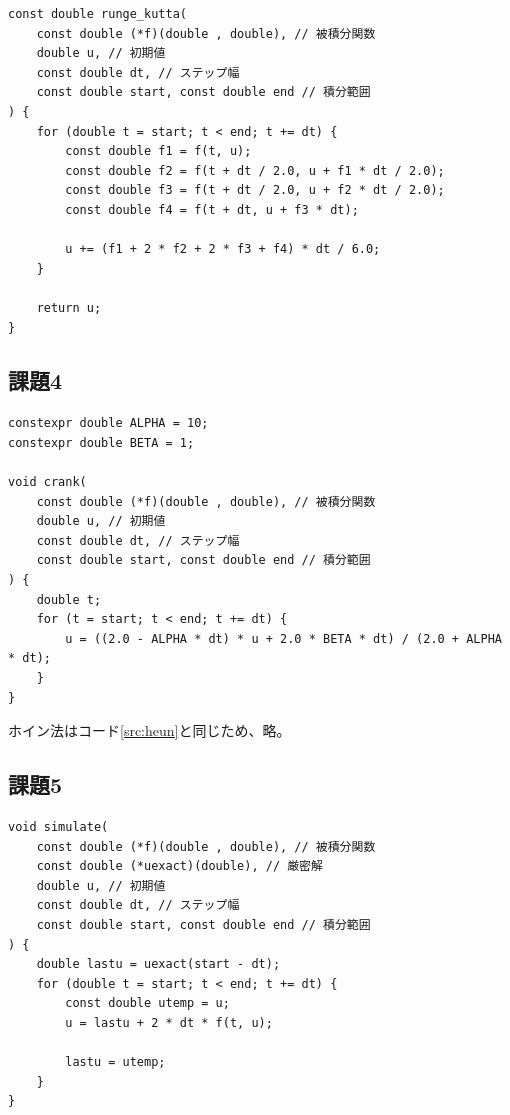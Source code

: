\documentclass[a4j, titlepage]{jsarticle}
\numberwithin{equation}{section}
\begin{document}
        \begin{lstlisting}[caption=4次ルンゲ・クッタ法]
const double runge_kutta(
    const double (*f)(double , double), // 被積分関数
    double u, // 初期値
    const double dt, // ステップ幅
    const double start, const double end // 積分範囲
) {
    for (double t = start; t < end; t += dt) {
        const double f1 = f(t, u);
        const double f2 = f(t + dt / 2.0, u + f1 * dt / 2.0);
        const double f3 = f(t + dt / 2.0, u + f2 * dt / 2.0);
        const double f4 = f(t + dt, u + f3 * dt);

        u += (f1 + 2 * f2 + 2 * f3 + f4) * dt / 6.0;
    }

    return u;
}
        \end{lstlisting}

    \subsection{課題4}
        \begin{lstlisting}[caption=クランク・ニコルソン法]
constexpr double ALPHA = 10;
constexpr double BETA = 1;

void crank(
    const double (*f)(double , double), // 被積分関数
    double u, // 初期値
    const double dt, // ステップ幅
    const double start, const double end // 積分範囲
) {
    double t;
    for (t = start; t < end; t += dt) {
        u = ((2.0 - ALPHA * dt) * u + 2.0 * BETA * dt) / (2.0 + ALPHA * dt);
    }
}
        \end{lstlisting}
        ホイン法はコード\ref{src:heun}と同じため、略。

    \subsection{課題5}
        \begin{lstlisting}[caption=式(\ref{equ:5alg})による数値計算]
void simulate(
    const double (*f)(double , double), // 被積分関数
    const double (*uexact)(double), // 厳密解
    double u, // 初期値
    const double dt, // ステップ幅
    const double start, const double end // 積分範囲
) {
    double lastu = uexact(start - dt);
    for (double t = start; t < end; t += dt) {
        const double utemp = u;
        u = lastu + 2 * dt * f(t, u);

        lastu = utemp;
    }
}
        \end{lstlisting}
\end{document}
